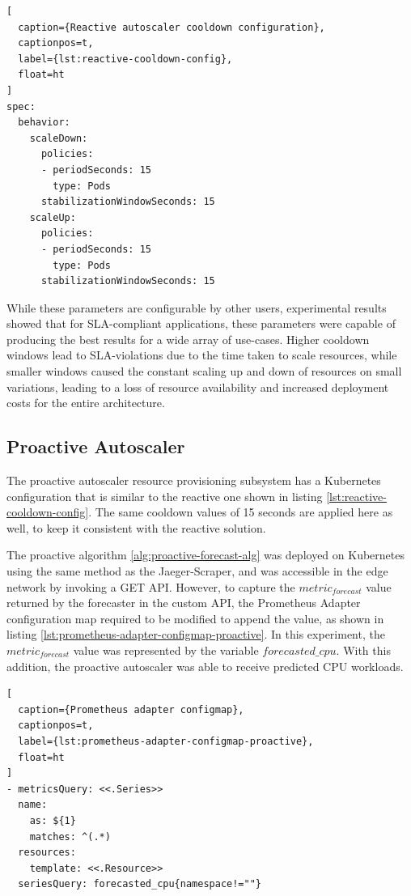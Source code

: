 \begin{lstlisting}[
  caption={Reactive autoscaler cooldown configuration},
  captionpos=t,
  label={lst:reactive-cooldown-config},
  float=ht
]
spec:
  behavior:
    scaleDown:
      policies:
      - periodSeconds: 15
        type: Pods
      stabilizationWindowSeconds: 15
    scaleUp:
      policies:
      - periodSeconds: 15
        type: Pods
      stabilizationWindowSeconds: 15
\end{lstlisting}

While these parameters are configurable by other users, experimental results showed that for SLA-compliant applications, these parameters were capable of producing the best results for a wide array of use-cases. Higher cooldown windows lead to SLA-violations due to the time taken to scale resources, while smaller windows caused the constant scaling up and down of resources on small variations, leading to a loss of resource availability and increased deployment costs for the entire architecture.

\subsection{Proactive Autoscaler}
\label{subsec:ch4-proactive-auto-subsection}

The proactive autoscaler resource provisioning subsystem has a Kubernetes configuration that is similar to the reactive one shown in listing \ref{lst:reactive-cooldown-config}. The same cooldown values of 15 seconds are applied here as well, to keep it consistent with the reactive solution.\par

The proactive algorithm \ref{alg:proactive-forecast-alg} was deployed on Kubernetes using the same method as the Jaeger-Scraper, and was accessible in the edge network by invoking a GET API. However, to capture the $metric_{forecast}$ value returned by the forecaster in the custom API, the Prometheus Adapter configuration map required to be modified to append the value, as shown in listing \ref{lst:prometheus-adapter-configmap-proactive}. In this experiment, the $metric_{forecast}$ value was represented by the variable $forecasted\_cpu$. With this addition, the proactive autoscaler was able to receive predicted CPU workloads.\par

\begin{lstlisting}[
  caption={Prometheus adapter configmap},
  captionpos=t,
  label={lst:prometheus-adapter-configmap-proactive},
  float=ht
]
- metricsQuery: <<.Series>>
  name:
    as: ${1}
    matches: ^(.*)
  resources:
    template: <<.Resource>>
  seriesQuery: forecasted_cpu{namespace!=""}
\end{lstlisting}

